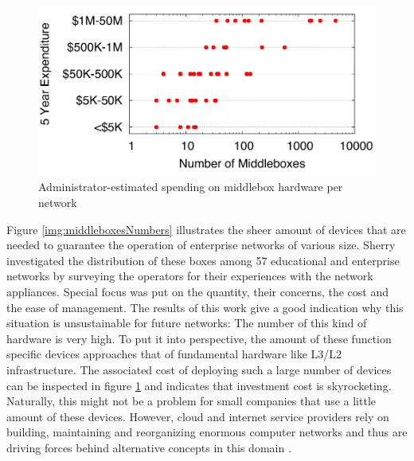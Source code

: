 \begin{figure}[h]
	\centering
	\includegraphics[width=1\linewidth]{images/middleboxesCost.png}
	\caption{Administrator-estimated spending on middlebox hardware per network \cite{sherry2016middleboxes}}
	\label{img:middleboxesCost}
\end{figure}
\newpage
Figure \ref{img:middleboxesNumbers} illustrates the sheer amount of devices that are needed to guarantee the operation of enterprise networks of various size. Sherry \cite{sherry2016middleboxes} \cite{sherry2012survey}  investigated the distribution of these boxes among 57 educational and enterprise networks by surveying the operators for their experiences with the network appliances. Special focus was put on the quantity, their concerns, the cost and the ease of management. The results of this work give a good indication why this situation is unsustainable for future networks:  The number of this kind of hardware is very high. To put it into perspective, the amount of these function specific devices approaches that of fundamental hardware like L3/L2 infrastructure. The associated cost of deploying such a large number of devices can be inspected in figure \ref{img:middleboxesCost} and indicates that investment cost is skyrocketing. Naturally, this might not be a problem for small companies that use a little amount of these devices. However, cloud and internet service providers rely on building, maintaining and reorganizing enormous computer networks and thus are driving forces behind alternative concepts in this domain \cite{sherry2016middleboxes} \cite{sherry2012survey}.

